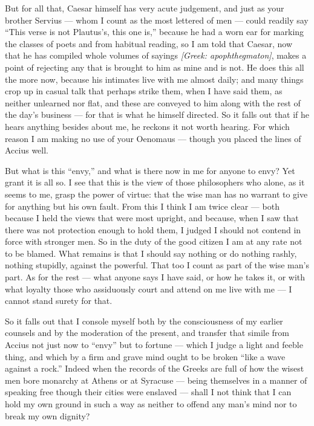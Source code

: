  But for all that, Caesar himself has very acute judgement, and just as your brother Servius --- whom I count as the most lettered of men --- could readily say ``This verse is not Plautus's, this one is,'' because he had a worn ear for marking the classes of poets and from habitual reading, so I am told that Caesar, now that he has compiled whole volumes of sayings \textit{[Greek: apophthegmaton]}, makes a point of rejecting any that is brought to him as mine and is not. He does this all the more now, because his intimates live with me almost daily; and many things crop up in casual talk that perhaps strike them, when I have said them, as neither unlearned nor flat, and these are conveyed to him along with the rest of the day's business --- for that is what he himself directed. So it falls out that if he hears anything besides about me, he reckons it not worth hearing. For which reason I am making no use of your Oenomaus --- though you placed the lines of Accius well.

 But what is this ``envy,'' and what is there now in me for anyone to envy? Yet grant it is all so. I see that this is the view of those philosophers who alone, as it seems to me, grasp the power of virtue: that the wise man has no warrant to give for anything but his own fault. From this I think I am twice clear --- both because I held the views that were most upright, and because, when I saw that there was not protection enough to hold them, I judged I should not contend in force with stronger men. So in the duty of the good citizen I am at any rate not to be blamed. What remains is that I should say nothing or do nothing rashly, nothing stupidly, against the powerful. That too I count as part of the wise man's part. As for the rest --- what anyone says I have said, or how he takes it, or with what loyalty those who assiduously court and attend on me live with me --- I cannot stand surety for that.

 So it falls out that I console myself both by the consciousness of my earlier counsels and by the moderation of the present, and transfer that simile from Accius not just now to ``envy'' but to fortune --- which I judge a light and feeble thing, and which by a firm and grave mind ought to be broken ``like a wave against a rock.'' Indeed when the records of the Greeks are full of how the wisest men bore monarchy at Athens or at Syracuse --- being themselves in a manner of speaking free though their cities were enslaved --- shall I not think that I can hold my own ground in such a way as neither to offend any man's mind nor to break my own dignity?


